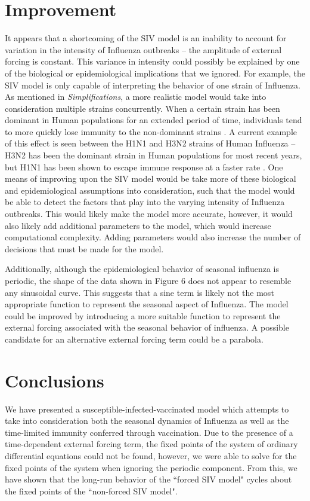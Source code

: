 \documentclass[12pt]{article}
\begin{document}
\section{Improvement}
It appears that a shortcoming of the SIV model is an inability to account for variation in the intensity of Influenza outbreaks -- the amplitude of external forcing is constant. This variance in intensity could possibly be explained by one of the biological or epidemiological implications that we ignored. For example, the SIV model is only capable of interpreting the behavior of one strain of Influenza. As mentioned in \textit{Simplifications}, a more realistic model would take into consideration multiple strains concurrently. When a certain strain has been dominant in Human populations for an extended period of time, individuals tend to more quickly lose immunity to the non-dominant strains \citep{bedford2015global}. A current example of this effect is seen between the H1N1 and H3N2 strains of Human Influenza -- H3N2 has been the dominant strain in Human populations for most recent years, but H1N1 has been shown to escape immune response at a faster rate \citep{lee2018deep}. One means of improving upon the SIV model would be take more of these biological and epidemiological assumptions into consideration, such that the model would be able to detect the factors that play into the varying intensity of Influenza outbreaks. This would likely make the model more accurate, however, it would also likely add additional parameters to the model, which would increase computational complexity. Adding parameters would also increase the number of decisions that must be made for the model.

Additionally, although the epidemiological behavior of seasonal influenza is periodic, the shape of the data shown in Figure 6 does not appear to resemble any sinusoidal curve. This suggests that a sine term is likely not the most appropriate function to represent the seasonal aspect of Influenza. The model could be improved by introducing a more suitable function to represent the external forcing associated with the seasonal behavior of influenza. A possible candidate for an alternative external forcing term could be a parabola.


\section{Conclusions}
We have presented a susceptible-infected-vaccinated model which attempts to take into consideration both the seasonal dynamics of Influenza as well as the time-limited immunity conferred through vaccination. Due to the presence of a time-dependent external forcing term, the fixed points of the system of ordinary differential equations could not be found, however, we were able to solve for the fixed points of the system when ignoring the periodic component. From this, we have shown that the long-run behavior of the ``forced SIV model" cycles about the fixed points of the ``non-forced SIV model". 
\end{document}
